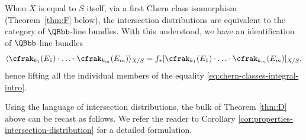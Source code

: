 When $X$ is equal to $S$ itself, via a first Chern class isomorphism (\cf Theorem~\ref{thm:F} below), the intersection distributions are equivalent to the category of $\QBbb$-line bundles. With this understood, we have an identification of $\QBbb$-line bundles
\begin{displaymath}
\langle \cfrak_{k_1}(E_1) \cdot \ldots \cdot \cfrak_{k_m}(E_m) \rangle_{X/S} = f_\ast [ \cfrak_{k_1}(E_1) \cdot \ldots \cdot \cfrak_{k_m}(E_m) ]_{X/S},
\end{displaymath}
hence lifting all the individual members of the equality \eqref{eq:chern-classes-integral-intro}.

Using the language of intersection distributions, the bulk of Theorem \ref{thm:D} above can be recast as follows. We refer the reader to Corollary \ref{cor:properties-intersection-distribution} for a detailed formulation.

